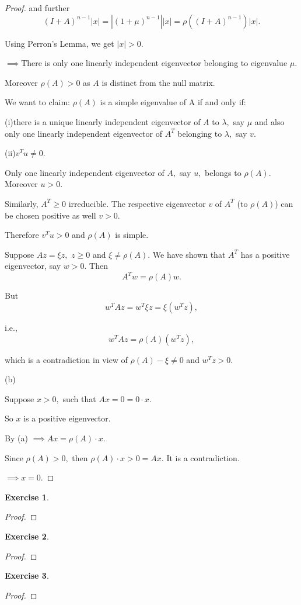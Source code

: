 \documentclass[11pt,a4paper]{article}
\renewcommand{\(}{\left(}
\renewcommand{\)}{\right)}
\newtheorem{exercise}{Exercise}
\begin{document}
\begin{proof}
  	
  	and further
  	\[
  	(I+A)^{n-1}\left\vert x\right\vert =\left\vert (1+\mu)^{n-1}\right\vert
  	\left\vert x\right\vert =\rho((I+A)^{n-1})\left\vert x\right\vert .
  	\]
  	
  	
  	Using Perron's Lemma, we get $\left\vert x\right\vert >0.$
  	
  	$\implies$There is only one linearly independent eigenvector belonging to
  	eigenvalue $\mu.$
  	
  	Moreover $\rho(A)>0$ as $A$ is distinct from the null matrix.
  	
  	We want to claim: $\rho(A)$ is a simple eigenvalue of A if and only if:
  	
  	(i)there is a unique linearly independent eigenvector of $A$ to $\lambda,$ say
  	$\mu$ and also only one linearly independent eigenvector of $A^{T}$ belonging
  	to $\lambda,$ say $v.$
  	
  	(ii)$v^{T}u\neq0.$
  	
  	Only one linearly independent eigenvector of $A,$ say $u,$ belongs to
  	$\rho(A).$ Moreover $u>0.$
  	
  	Similarly, $A^{T}\geq0$ irreducible. The respective eigenvector $v$ of $A^{T}$
  	(to $\rho(A)$) can be chosen positive as well $v>0.$
  	
  	Therefore $v^{T}u>0$ and $\rho(A)$ is simple.
  	
  	Suppose $Az=\xi z,$ $z\geq0$ and $\xi\neq\rho(A).$ We have shown that $A^{T}$
  	has a positive eigenvector, say $w>0.$ Then%
  	\[
  	A^{T}w=\rho(A)w.
  	\]
  	
  	
  	But
  	\[
  	w^{T}Az=w^{T}\xi z=\xi(w^{T}z),
  	\]
  	
  	
  	\bigskip i.e.,%
  	\[
  	w^{T}Az=\rho(A)(w^{T}z),
  	\]
  	
  	
  	which is a contradiction in view of $\rho(A)-\xi\neq0$ and $w^{T}z>0.$
  	
  	(b)
  	
  	Suppose $x>0,$ such that $Ax=0=0\cdot x.$
  	
  	So $x$ is a positive eigenvector.
  	
  	By (a) $\implies Ax=\rho(A)\cdot x.$
  	
  	Since $\rho(A)>0,$ then $\rho(A)\cdot x>0=Ax.$ It is a contradiction.
  	
  	$\implies x=0.$
  \end{proof}

  \begin{exercise}
  \end{exercise}  
  \begin{proof}
  	
  \end{proof}

  \begin{exercise}
  \end{exercise}  
  \begin{proof}
  	
  \end{proof}

  \begin{exercise}
  \end{exercise}  
  \begin{proof}
  	
  \end{proof}  
\end{document}
